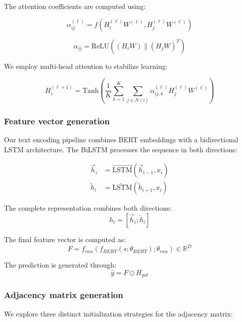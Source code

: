 \documentclass{article}
\begin{document}
The attention coefficients are computed using:

\begin{equation}
\alpha_{ij}^{(\ell)} = f\left(H_i^{(\ell)}W^{(\ell)}, H_j^{(\ell)}W^{(\ell)}\right)
\end{equation}

\begin{equation}
\alpha_{ij} = \text{ReLU}\left((H_iW) \parallel (H_jW)^T\right)
\end{equation}

We employ multi-head attention to stabilize learning:

\begin{equation}
H_i^{(\ell+1)} = \text{Tanh}\left(\frac{1}{K}\sum_{k=1}^K\sum_{j\in N(i)}\alpha_{ij,k}^{(\ell)}H_j^{(\ell)}W^{(\ell)}\right)
\end{equation}

\subsubsection{Feature vector generation}
Our text encoding pipeline combines BERT embeddings with a bidirectional LSTM architecture. The BiLSTM processes the sequence in both directions:

\begin{align}
\vec{h}_i &= \overrightarrow{\text{LSTM}}(\vec{h}_{i-1}, x_i) \\
\overleftarrow{h}_i &= \overleftarrow{\text{LSTM}}(\overleftarrow{h}_{i+1}, x_i)
\end{align}

The complete representation combines both directions:
\begin{equation}
h_i = [\vec{h}_i; \overleftarrow{h}_i]
\end{equation}

The final feature vector is computed as:
\begin{equation}
F = f_{rnn}(f_{BERT}(s; \theta_{BERT}); \theta_{rnn}) \in \mathbb{R}^D
\end{equation}

The prediction is generated through:
\begin{equation}
\hat{y} = F \odot H_{gat}
\end{equation}

\subsubsection{Adjacency matrix generation}
We explore three distinct initialization strategies for the adjacency matrix:
\end{document}
